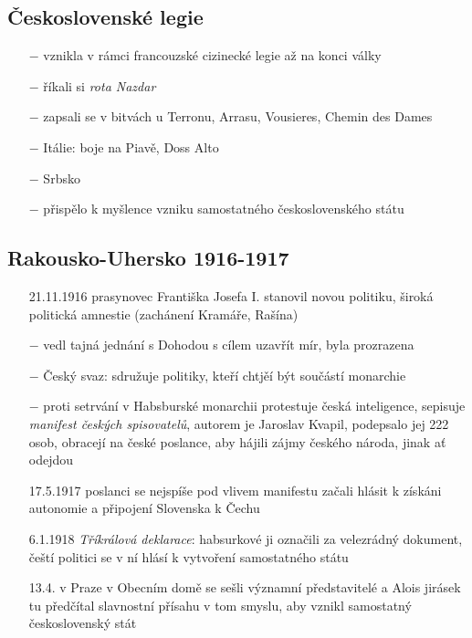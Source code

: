 \documentclass{article}
\begin{document}
\subsection*{Československé legie}
\begin{itemize}
    \vspace{-0.5em}
    \setlength\itemsep{0.15em}
    \item[$-$] vznikla v rámci francouzské cizinecké legie až na konci války
    \item[$-$] říkali si \textit{rota Nazdar}
    \item[$-$] zapsali se v bitvách u Terronu, Arrasu, Vousieres, Chemin des Dames
    \item[$-$] Itálie: boje na Piavě, Doss Alto
    \item[$-$] Srbsko
    \item[$-$] přispělo k myšlence vzniku samostatného československého státu
\end{itemize}

\subsection*{Rakousko-Uhersko 1916-1917}
\begin{itemize}
    \vspace{-0.5em}
    \setlength\itemsep{0.15em}
    \item[21.11.1916] prasynovec Františka Josefa I. stanovil novou politiku, široká politická amnestie (zachánení Kramáře, Rašína)
    \item[$-$] vedl tajná jednání s Dohodou s cílem uzavřít mír, byla prozrazena
    \item[$-$] Český svaz: sdružuje politiky, kteří chtjěí být součástí monarchie
    \item[$-$] proti setrvání v Habsburské monarchii protestuje česká inteligence, sepisuje \textit{manifest českých spisovatelů}, autorem je Jaroslav Kvapil, podepsalo jej 222 osob, obracejí na české poslance, aby hájili zájmy českého národa, jinak ať odejdou
    \item[17.5.1917] poslanci se nejspíše pod vlivem manifestu začali hlásit k získáni autonomie a připojení Slovenska k Čechu
    \item[6.1.1918] \textit{Tříkrálová deklarace}: habsurkové ji označili za velezrádný dokument, čeští politici se v ní hlásí k vytvoření samostatného státu
    \item[13.4.] v Praze v Obecním domě se sešli významní představitelé a Alois jirásek tu předčítal slavnostní přísahu v tom smyslu, aby vznikl samostatný československý stát
\end{itemize}
\end{document}

